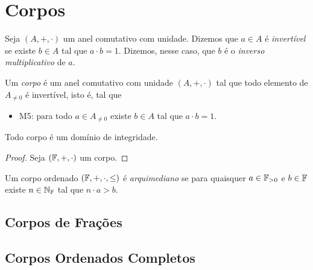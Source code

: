 \section{Corpos}

\begin{definition}
    Seja $(A, +, \cdot)$ um anel comutativo com unidade. Dizemos que $a \in A$ é \emph{invertível} se existe $b \in A$ tal que $a \cdot b = 1$. Dizemos, nesse caso, que $b$ é o \emph{inverso multiplicativo} de $a$.
\end{definition}

\begin{definition}
    Um \emph{corpo} é um anel comutativo com unidade $(A, +, \cdot)$ tal que todo elemento de $A_{\neq 0}$ é invertível, isto é, tal que
        \begin{itemize}
            \item M5: para todo $a \in A_{\neq 0}$ existe $b \in A$ tal que $a \cdot b = 1$.
        \end{itemize}
\end{definition}

\begin{proposition}
    Todo corpo é um domínio de integridade.
\end{proposition}

\begin{proof}
    Seja $(\mathbb{F}, +, \cdot)$ um corpo. \blackproof
\end{proof}

\begin{definition}
    Um corpo ordenado $(\mathbb{F}, +, \cdot, \leq)$ é \emph{arquimediano} se para quaisquer $a \in \mathbb{F}_{>0}$ e $b \in \mathbb{F}$ existe $n \in \mathbb{N}_{\mathbb{F}}$ tal que $n \cdot a > b$.
\end{definition}

\subsection{Corpos de Frações}

\subsection{Corpos Ordenados Completos}

